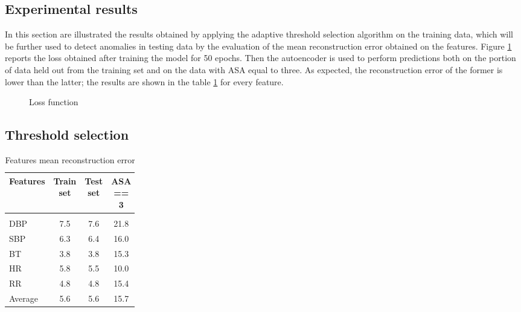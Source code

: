\documentclass{article}
\begin{document}
\begin{multicols*}{2}
			
\section{Experimental results}
\label{results}
In this section are illustrated the results obtained by applying the adaptive threshold selection algorithm on the training data, which will be further used to detect anomalies in testing data by the evaluation of the mean reconstruction error obtained on the features.
Figure \ref{fig:loss} reports the loss obtained after training the model for 50 epochs.
Then the autoencoder is used to perform predictions both on the portion of data held out from the training set and on the data with ASA equal to three. As expected, the reconstruction error of the former is lower than the latter; the results are shown in the table \ref{table:results} for every feature.

\begin{figure}[H]
	\centering
	\caption{Loss function}
	\label{fig:loss}
\end{figure}


\subsection{Threshold selection}


\begin{table}[H]
	\centering
	\begin{tabular}{    p{0.25\linewidth} | c | c | c  } 
		
		Features & Train set  & Test set  &  ASA == 3 \\ 
		\hline\\[-2.7ex]
		DBP & 7.5 & 7.6 & 21.8 \\
		SBP & 6.3 & 6.4 & 16.0 \\
		BT & 3.8  & 3.8 & 15.3 \\
		HR & 5.8 & 5.5 & 10.0 \\
		RR & 4.8 & 4.8 & 15.4 \\
		\hline
		Average & 5.6 & 5.6 & 15.7
	\end{tabular}
	\caption{Features mean reconstruction error}
	\label{table:results}
\end{table}


\end{multicols*}
\end{document}
